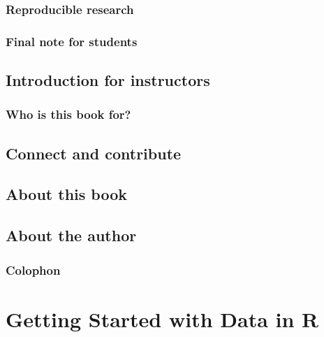 \documentclass[12pt, krantz2,]{krantz}
\begin{document}
\hypertarget{subsec:reproducible}{%
\subsection{Reproducible research}\label{subsec:reproducible}}

\hypertarget{final-note-for-students}{%
\subsection{Final note for students}\label{final-note-for-students}}

\hypertarget{sec:intro-instructors}{%
\section{Introduction for instructors}\label{sec:intro-instructors}}

\hypertarget{who-is-this-book-for}{%
\subsection{Who is this book for?}\label{who-is-this-book-for}}

\hypertarget{sec:connect-contribute}{%
\section{Connect and contribute}\label{sec:connect-contribute}}

\hypertarget{sec:about-book}{%
\section{About this book}\label{sec:about-book}}

\hypertarget{sec:about-authors}{%
\section{About the author}\label{sec:about-authors}}

\hypertarget{colophon}{%
\subsection{Colophon}\label{colophon}}

\hypertarget{getting-started}{%
\chapter{Getting Started with Data in R}\label{getting-started}}
\end{document}
